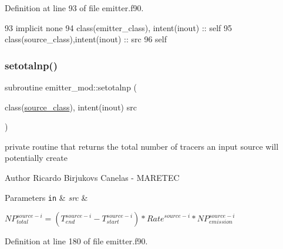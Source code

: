 Definition at line 93 of file emitter.\+f90.


\begin{DoxyCode}
93     \textcolor{keywordtype}{implicit none}
94     \textcolor{keywordtype}{class}(emitter\_class), \textcolor{keywordtype}{intent(inout)} :: self
95     \textcolor{keywordtype}{class}(source\_class),\textcolor{keywordtype}{intent(inout)} :: src
96     self%
\end{DoxyCode}
\mbox{\label{namespaceemitter__mod_a5c219dd6692a761ad4bf968ae750fcc6}} 
\subsubsection{\texorpdfstring{setotalnp()}{setotalnp()}}
{\footnotesize\ttfamily subroutine emitter\+\_\+mod\+::setotalnp (\begin{DoxyParamCaption}\item[{class(\mbox{\hyperlink{structsources__mod_1_1source__class}{source\+\_\+class}}), intent(inout)}]{src }\end{DoxyParamCaption})\hspace{0.3cm}{\ttfamily [private]}}



private routine that returns the total number of tracers an input source will potentially create 

\begin{DoxyAuthor}{Author}
Ricardo Birjukovs Canelas -\/ M\+A\+R\+E\+T\+EC
\end{DoxyAuthor}

\begin{DoxyParams}[1]{Parameters}
\mbox{\tt in}  & {\em src} & \\
\hline
\end{DoxyParams}
${NP}_{total}^{source-i}=(T_{end}^{source-i}-T_{start}^{source-i})*{Rate}^{source-i}*{NP}_{emission}^{source-i}$ 

Definition at line 180 of file emitter.\+f90.


